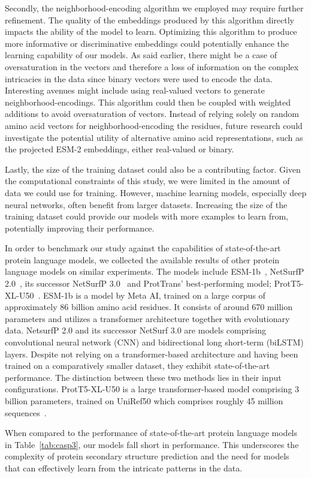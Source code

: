 Secondly, the neighborhood-encoding algorithm we employed may require further refinement. The quality of the embeddings produced by this algorithm directly impacts the ability of the model to learn. Optimizing this algorithm to produce more informative or discriminative embeddings could potentially enhance the learning capability of our models. As said earlier, there might be a case of oversaturation in the vectors and therefore a loss of information on the complex intricacies in the data since binary vectors were used to encode the data. Interesting avenues might include using real-valued vectors to generate neighborhood-encodings. This algorithm could then be coupled with weighted additions to avoid oversaturation of vectors. Instead of relying solely on random amino acid vectors for neighborhood-encoding the residues, future research could investigate the potential utility of alternative amino acid representations, such as the projected ESM-2 embeddings, either real-valued or binary.

Lastly, the size of the training dataset could also be a contributing factor. Given the computational constraints of this study, we were limited in the amount of data we could use for training. However, machine learning models, especially deep neural networks, often benefit from larger datasets. Increasing the size of the training dataset could provide our models with more examples to learn from, potentially improving their performance.

In order to benchmark our study against the capabilities of state-of-the-art protein language models, we collected the available results of other protein language models on similar experiments. The models include ESM-1b~\cite{esm}, NetSurfP 2.0~\cite{netsurf}, its successor NetSurfP 3.0~\cite{netsurf3} and ProtTrans' best-performing model; ProtT5-XL-U50~\cite{prottrans}. ESM-1b is a model by Meta AI, trained on a large corpus of approximately 86 billion amino acid residues. It consists of around 670 million parameters and utilizes a transformer architecture together with evolutionary data. NetsurfP 2.0 and its successor NetSurf 3.0 are models comprising convolutional neural network (CNN) and bidirectional long short-term (biLSTM) layers. Despite not relying on a transformer-based architecture and having been trained on a comparatively smaller dataset, they exhibit state-of-the-art performance. The distinction between these two methods lies in their input configurations. ProtT5-XL-U50 is a large transformer-based model comprising 3 billion parameters, trained on UniRef50 which comprises roughly 45 million sequences~\cite{uniref}.

When compared to the performance of state-of-the-art protein language models in Table~\ref{tab:casp3}, our models fall short in performance. This underscores the complexity of protein secondary structure prediction and the need for models that can effectively learn from the intricate patterns in the data.
